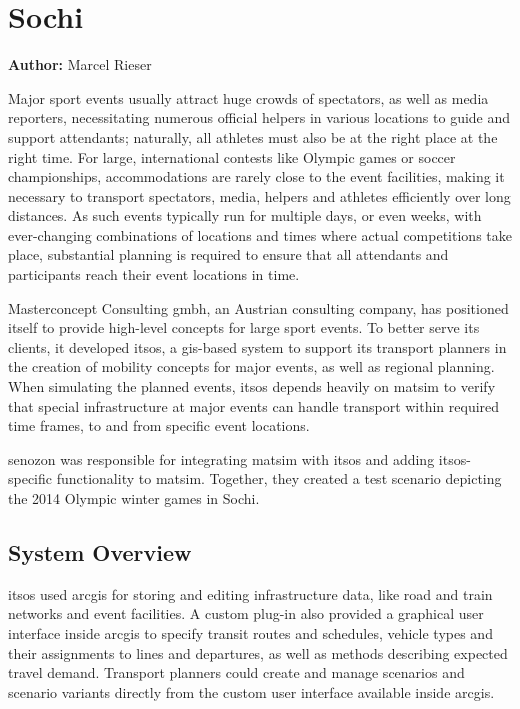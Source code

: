 \section{Sochi}
\label{sec:sochi}
\hfill \textbf{Author:} Marcel Rieser


Major sport events usually attract huge crowds of spectators, as well as media
reporters, necessitating numerous official helpers in various locations to guide and
support attendants; naturally, all athletes must also be at
the right place at the right time. For large, international contests like
Olympic games or soccer championships, accommodations are rarely close to the
event facilities, making it necessary to transport spectators, media, helpers
and athletes efficiently over long distances. As such events typically run for
multiple days, or even weeks, with ever-changing combinations of locations and
times where actual competitions take place, substantial planning is required to
ensure that all attendants and participants reach their event locations in time.

Masterconcept Consulting \gls{gmbh}, an Austrian consulting company, has positioned
itself to provide high-level concepts for large sport events. To better serve its clients, 
it developed \gls{itsos}, a \gls{gis}-based system to support its transport
planners in the creation of mobility concepts for major events, as well as 
regional planning. When simulating the planned
events, \gls{itsos} depends heavily on \gls{matsim} to verify that special infrastructure
at major events can handle transport within required time frames, to and from
specific event locations.

\gls{senozon} was responsible for integrating \gls{matsim} with \gls{itsos} and adding \gls{itsos}-specific
functionality to \gls{matsim}. Together, they created a test scenario depicting the
2014 Olympic winter games in Sochi.

\subsection{System Overview}
\gls{itsos} used \gls{arcgis} for storing and editing infrastructure data, like road
and train networks and event facilities. A custom plug-in also provided a
graphical user interface inside \gls{arcgis} to specify transit routes and schedules,
vehicle types and their assignments to lines and departures, as well as methods
describing expected travel demand. Transport planners could create and manage
scenarios and scenario variants directly from the custom user interface
available inside \gls{arcgis}.

